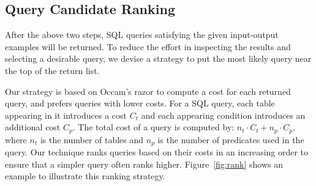 \subsection{Query Candidate Ranking}
\label{sec:ranking}

After the above two steps, SQL queries satisfying the given input-output examples
will be returned. To reduce the effort in inspecting the
results and selecting a desirable query, we devise a strategy
to put the most likely query near the top of the return list.

Our strategy is based on Occam's razor to
compute a cost for each returned query, and prefers
queries with lower costs.
For a SQL query, each table appearing in it introduces a cost $C_t$ and each appearing condition 
introduces an additional cost $C_p$. The total cost of a query is
computed by: $n_t \cdot C_t+n_p \cdot C_p$, where
$n_t$ is the number of tables and $n_p$ is the number of predicates used in the query. Our technique 
ranks queries based on their costs in an increasing order to ensure that a simpler query often ranks higher.
Figure~\ref{fig:rank} shows an example to illustrate this ranking strategy.



